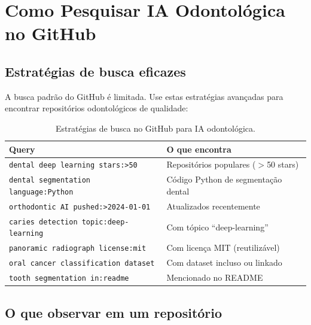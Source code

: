 \section{Como Pesquisar IA Odontológica no GitHub}

\subsection{Estratégias de busca eficazes}

A busca padrão do GitHub é limitada. Use estas estratégias avançadas
para encontrar repositórios odontológicos de qualidade:

\begin{table}[H]
  \centering
  \caption{Estratégias de busca no GitHub para IA odontológica.}
  \label{tab:github-search}
  \begin{tabularx}{\textwidth}{lX}
    \toprule
    \textbf{Query} & \textbf{O que encontra} \\
    \midrule
    \texttt{dental deep learning stars:>50} & Repositórios populares ($>$50 stars) \\
    \texttt{dental segmentation language:Python} & Código Python de segmentação dental \\
    \texttt{orthodontic AI pushed:>2024-01-01} & Atualizados recentemente \\
    \texttt{caries detection topic:deep-learning} & Com tópico ``deep-learning'' \\
    \texttt{panoramic radiograph license:mit} & Com licença MIT (reutilizável) \\
    \texttt{oral cancer classification dataset} & Com dataset incluso ou linkado \\
    \texttt{tooth segmentation in:readme} & Mencionado no README \\
    \bottomrule
  \end{tabularx}
\end{table}

 


\subsection{O que observar em um repositório}

